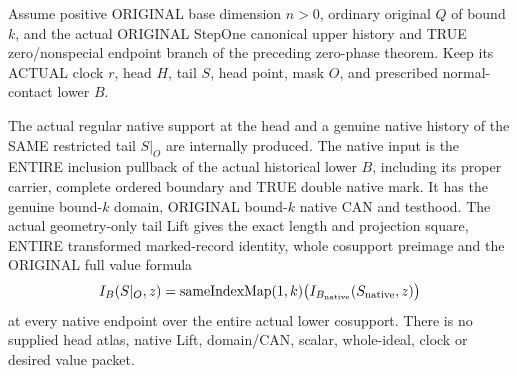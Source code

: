 \begin{theorem}
\label{hir:g1-proper-normal-zero-phase-native-history}
\leanok
Assume positive ORIGINAL base dimension $n>0$, ordinary original $Q$
of bound $k$, and the actual ORIGINAL StepOne canonical upper history
and TRUE zero/nonspecial endpoint branch of the preceding zero-phase
theorem. Keep its ACTUAL clock $r$, head $H$, tail $S$, head point,
mask $O$, and prescribed normal-contact lower $B$.

The actual regular native support at the head and a genuine native
history of the SAME restricted tail $S|_O$ are internally produced.
The native input is the ENTIRE inclusion pullback of the actual
historical lower $B$, including its proper carrier, complete ordered
boundary and TRUE double native mark. It has the genuine bound-$k$
domain, ORIGINAL bound-$k$ native CAN and testhood. The actual
geometry-only tail Lift gives the exact length and projection
square, ENTIRE transformed marked-record identity, whole cosupport
preimage and the ORIGINAL full value formula
\[
 I_B(S|_O,z)=\operatorname{sameIndexMap}(1,k)
              \bigl(I_{B_{\rm native}}(S_{\rm native},z)\bigr)
\]
at every native endpoint over the entire actual lower cosupport.
There is no supplied head atlas, native Lift, domain/CAN, scalar,
whole-ideal, clock or desired value packet.
\end{theorem}

